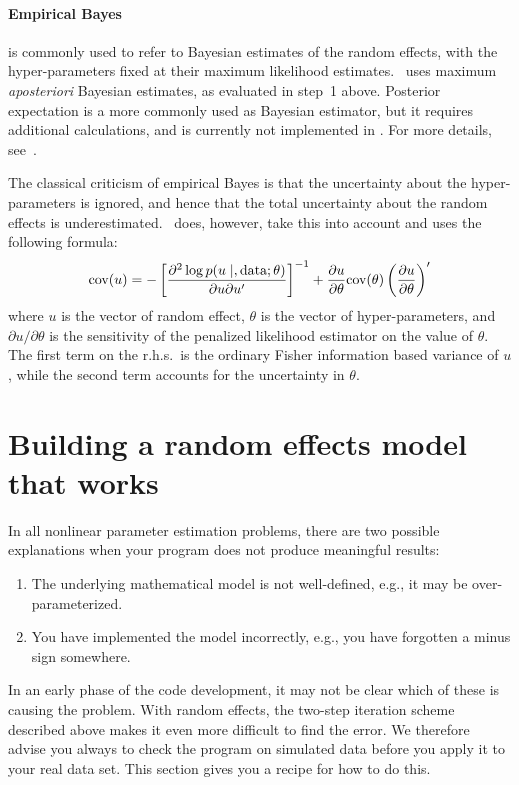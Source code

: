 \documentclass{admbmanual}
\newcommand{\citeasnoun}{\cite}
\begin{document}
\paragraph{Empirical Bayes} is commonly used to refer to Bayesian estimates of
the random effects, with the hyper-parameters fixed at their maximum likelihood
estimates. \scAR\ uses maximum \textit{aposteriori} Bayesian estimates, as
evaluated in step~1 above. Posterior expectation is a more commonly used as
Bayesian estimator, but it requires additional calculations, and is currently
not implemented in \scAR. For more details,
see~\citeasnoun{skaug_fournier1996aam}.

The classical criticism of empirical Bayes is that the uncertainty about the
hyper-parameters is ignored, and hence that the total uncertainty about the
random effects is underestimated. \scAR\ does, however, take this into account
and uses the following formula:
\begin{equation}
  \textrm{cov}(u) =
  -\left[\frac{\partial^2\log p(u \mid, \hbox{data};\theta)}
    {\partial u\partial u^{\prime}}\right]^{-1}+ \frac{
    \partial u}{\partial\theta}
  \hbox{cov}(\theta) \left(\frac{\partial u}{\partial\theta}\right)^{\prime}
  \label{eq:EB_variance}
\end{equation}
where $u$ is the vector of random effect, $\theta$ is the vector of
hyper-parameters, and $\partial u/\partial\theta$ is the sensitivity of the
penalized likelihood estimator on the value of $\theta$. The first term on the
r.h.s.~is the ordinary Fisher information based variance of $u$, while the
second term accounts for the uncertainty in $\theta$.

\section{Building a random effects model that works}

In all nonlinear parameter estimation problems, there are two possible
explanations when your program does not produce meaningful results:
\begin{enumerate}
  \item The underlying mathematical model is not well-defined, e.g., it may be
  over-parameterized.
  \item You have implemented the model incorrectly, e.g., you have forgotten a
  minus sign somewhere.
\end{enumerate}
In an early phase of the code development, it may not be clear which of these is
causing the problem. With random effects, the two-step iteration scheme
described above makes it even more difficult to find the error. We therefore
advise you always to check the program on simulated data before you apply it to
your real data set. This section gives you a recipe for how to do this.
\end{document}
